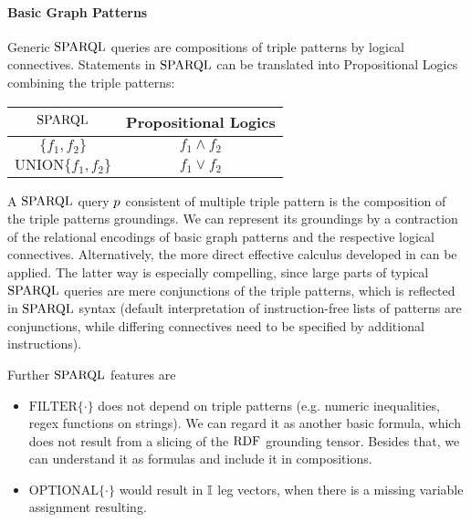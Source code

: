 \paragraph{Basic Graph Patterns}

Generic $\mathrm{SPARQL}$ queries are compositions of triple patterns by logical connectives. %
Statements in $\mathrm{SPARQL}$ can be translated into Propositional Logics combining the triple patterns:
\begin{center}
	\begin{tabular}{|c|c|}
  	\hline
 	\textbf{$\mathrm{SPARQL}$} & \textbf{Propositional Logics} \\
  	\hline
 	$\{f_1, f_2\}$ & $f_1\land f_2$ \\
  	\hline
 	$\mathrm{UNION}\{f_1, f_2\} $& $f_1\lor f_2$ \\
  	\hline
	\end{tabular}
\end{center}

A $\mathrm{SPARQL}$ query $p$ consistent of multiple triple pattern is the composition of the triple patterns groundings.
We can represent its groundings by a contraction of the relational encodings of basic graph patterns and the respective logical connectives.
Alternatively, the more direct effective calculus developed in  can be applied.
The latter way is especially compelling, since large parts of typical $\mathrm{SPARQL}$ queries are mere conjunctions of the triple patterns, which is reflected in $\mathrm{SPARQL}$ syntax (default interpretation of instruction-free lists of patterns are conjunctions, while differing connectives need to be specified by additional instructions).



Further $\mathrm{SPARQL}$ features are
\begin{itemize}
	\item $\mathrm{FILTER}\{\cdot\}$ does not depend on triple patterns (e.g. numeric inequalities, regex functions on strings). 
		We can regard it as another basic formula, which does not result from a slicing of the $\mathrm{RDF}$ grounding tensor.
		Besides that, we can understand it as formulas and include it in compositions.
	\item $\mathrm{OPTIONAL}\{\cdot\}$ would result in $\mathbb{I}$ leg vectors, when there is a missing variable assignment resulting.
\end{itemize}







